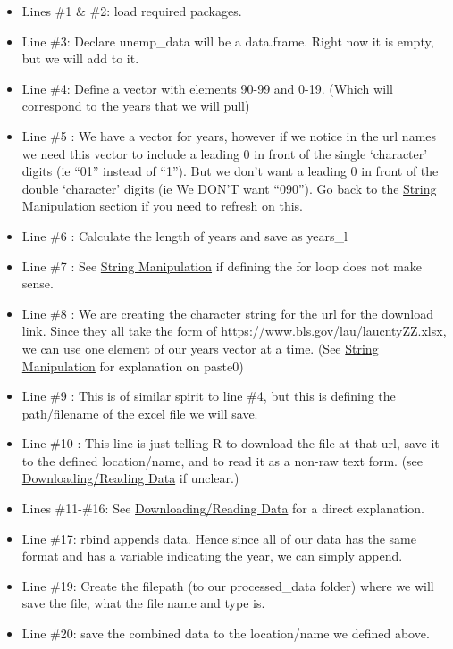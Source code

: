 \documentclass[
]{book}
\providecommand{\tightlist}{%
  \setlength{\itemsep}{0pt}\setlength{\parskip}{0pt}}
\begin{document}
\begin{itemize}
\tightlist
\item
  Lines \#1 \& \#2: load required packages.
\item
  Line \#3: Declare unemp\_data will be a data.frame. Right now it is empty, but we will add to it.
\item
  Line \#4: Define a vector with elements 90-99 and 0-19. (Which will correspond to the years that we will pull)
\item
  Line \#5 : We have a vector for years, however if we notice in the url names we need this vector to include a leading 0 in front of the single `character' digits (ie ``01'' instead of ``1''). But we don't want a leading 0 in front of the double `character' digits (ie We DON'T want ``090''). Go back to the \href{https://jmwestenberg.github.io/courses/rcourse/intro/lesson1_02/}{String Manipulation} section if you need to refresh on this.
\item
  Line \#6 : Calculate the length of years and save as years\_l
\item
  Line \#7 : See \href{https://jmwestenberg.github.io/courses/rcourse/intro/lesson1_02/}{String Manipulation} if defining the for loop does not make sense.
\item
  Line \#8 : We are creating the character string for the url for the download link. Since they all take the form of \url{https://www.bls.gov/lau/laucntyZZ.xlsx}, we can use one element of our years vector at a time. (See \href{https://jmwestenberg.github.io/courses/rcourse/intro/lesson1_02/}{String Manipulation} for explanation on paste0)
\item
  Line \#9 : This is of similar spirit to line \#4, but this is defining the path/filename of the excel file we will save.
\item
  Line \#10 : This line is just telling R to download the file at that url, save it to the defined location/name, and to read it as a non-raw text form. (see \href{https://jmwestenberg.github.io/courses/rcourse/intro/lesson1_04/}{Downloading/Reading Data} if unclear.)
\item
  Lines \#11-\#16: See \href{https://jmwestenberg.github.io/courses/rcourse/intro/lesson1_04/}{Downloading/Reading Data} for a direct explanation.
\item
  Line \#17: rbind appends data. Hence since all of our data has the same format and has a variable indicating the year, we can simply append.
\item
  Line \#19: Create the filepath (to our processed\_data folder) where we will save the file, what the file name and type is.
\item
  Line \#20: save the combined data to the location/name we defined above.
\end{itemize}
\end{document}
